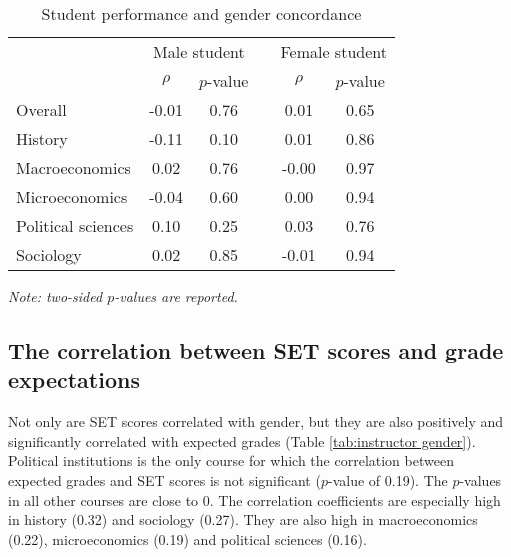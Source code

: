 \documentclass[12pt]{article}
\begin{document}
\begin{table}[htbp]
  \centering
  \footnotesize 
  \caption{Student performance and gender concordance}
    \begin{tabular}{lccccc}
    \toprule 
          & \multicolumn{2}{c}{Male student}  &  & \multicolumn{2}{c}{Female student} \\
      & $\rho$  &  $p$-value &  & $\rho$  &  $p$-value    \\
                             \midrule
      \quad  Overall &                 -0.01       & 0.76 & &  0.01       & 0.65  \\
      \quad  History &                 -0.11       & 0.10 & &  0.01       & 0.86   \\
      \quad  Macroeconomics &           0.02       & 0.76 & & -0.00       & 0.97   \\
      \quad  Microeconomics &          -0.04       & 0.60 & &  0.00       & 0.94  \\
      \quad  Political sciences &       0.10       & 0.25 & &  0.03       & 0.76  \\
      \quad  Sociology &                0.02       & 0.85 & & -0.01       & 0.94  \\
    \bottomrule
    \end{tabular}%
 \label{tab:finalconcordance}%
  
  \textit{Note: two-sided $p$-values are reported.}
\end{table}%
\normalsize





\subsection{The correlation between SET scores and grade expectations}

Not only are SET scores correlated with gender, but they are also positively and significantly correlated with expected grades (Table \ref{tab:instructor gender}). Political institutions is the only course for which the correlation between expected grades and SET scores is not significant ($p$-value of 0.19). The $p$-values in all other courses are close to 0. The correlation coefficients are especially high in history (0.32) and sociology (0.27). They are also high in macroeconomics (0.22), microeconomics (0.19) and political sciences (0.16).
\end{document}
